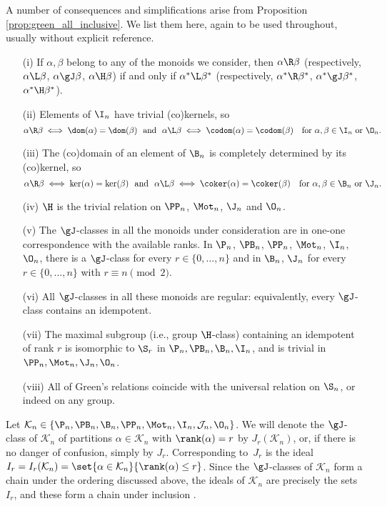 \begin{rem}\label{rem:green_sumbonoids}
A number of consequences and simplifications arise
from Proposition \ref{prop:green_all_inclusive}.
We list them here, again to be used throughout, usually without explicit reference.
\begin{itemize}
\item[(i)]    \label{rem:gs:item1}
If $\alpha,\beta$ belong to any of the monoids we consider, then $\alpha\R\beta$ (respectively, $\alpha\L\beta$, $\alpha\gJ\beta$, $\alpha\H\beta$)
if and only if $\alpha^\ast\L\beta^\ast$ (respectively, $\alpha^\ast\R\beta^\ast$, $\alpha^\ast\gJ\beta^\ast$, $\alpha^\ast\H\beta^\ast$).
\item[(ii)] \label{rem:gs:item2}
Elements of $\I_n$ have trivial (co)kernels, so
\[
\alpha\R\beta \iff \dom(\alpha)=\dom(\beta)\ \
\text{and}\ \
\alpha\L\beta \iff \codom(\alpha)=\codom(\beta)
\ \ \ \text{for} \  \alpha,\beta\in\I_n \text{ or } \O_n.
\]
\item[(iii)] \label{rem:gs:item3}
The (co)domain of an element of $\B_n$ is completely determined by its (co)kernel, so
\[
\alpha\R\beta \iff \ker(\alpha)=\ker(\beta) \ \
\text{and}\ \
 \alpha\L\beta \iff \coker(\alpha)=\coker(\beta)\ \ \
 \text{for}\  \alpha,\beta\in\B_n \  \text{or}\ \J_n.
\]
\item[(iv)] \label{rem:gs:item4}
$\H$ is the trivial relation on $\PP_n$, $\Mot_n$, $\J_n$ and $\O_n$.
\item[(v)] \label{rem:gs:item5}
The $\gJ$-classes in all the monoids under consideration are in one-one
  correspondence with the available ranks. In $\P_n$, $\PB_n$, $\PP_n$, $\Mot_n$,
  $\I_n$, $\O_n$, there is a $\gJ$-class for every $r\in\{0,\dots,n\}$
  and in $\B_n$, $\J_n$ for every $r\in\{0,\dots,n\}$ with $r\equiv n\pmod{2}$.
\item[(vi)] \label{rem:gs:item6}
All $\gJ$-classes in all these monoids are regular: equivalently, every
  $\gJ$-class contains an idempotent.
\item[(vii)] \label{rem:gs:item7}
The maximal subgroup (i.e., group $\H$-class)  containing an idempotent of rank $r$ is isomorphic to $\S_r$ in
$\P_n,\PB_n,\B_n,\I_n$, and is trivial in $\PP_n,\Mot_n,\J_n, \O_n$.
\item[(viii)] \label{rem:gs:item8}
All of Green's relations coincide with the universal relation on $\S_n$, or indeed on any group.
\end{itemize}
\end{rem}

Let $\mathcal{K}_n\in\{\P_n,\PB_n,\B_n,\PP_n,\Mot_n,\I_n,\mathcal J_n,\O_n\}$.
We will denote the $\gJ$-class of $\mathcal{K}_n$ of partitions $\alpha\in\mathcal{K}_n$ with $\rank(\alpha)=r$ by $J_r(\mathcal{K}_n)$, or, if there is no danger of confusion, simply by $J_r$.
Corresponding to~$J_r$ is the ideal
$I_r=I_r(\mathcal{K}_n)=\set{\alpha\in\mathcal{K}_n}{\rank(\alpha)\leq r}$.
Since the $\gJ$-classes of $\mathcal K_n$ form a chain under the ordering discussed above, the ideals of $\mathcal K_n$ are precisely the sets $I_r$, and these form a chain under inclusion \cite[Proposition 2.6]{DEG2017}.


